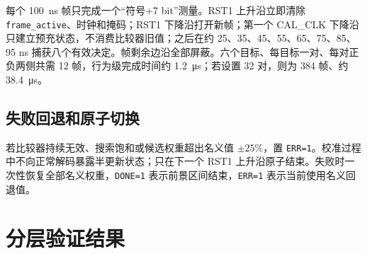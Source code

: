 \documentclass[UTF8,a4paper,11pt]{ctexart}
\newcommand{\code}[1]{\texttt{#1}}
\begin{document}
每个 \SI{100}{ns} 帧只完成一个“符号+7 bit”测量。RST1 上升沿立即清除 \code{frame\_active}、时钟和掩码；RST1 下降沿打开新帧；第一个 CAL\_CLK 下降沿只建立预充状态，不消费比较器旧值；之后在约 25、35、45、55、65、75、85、95 ns 捕获八个有效决定。帧剩余边沿全部屏蔽。六个目标、每目标一对、每对正负两侧共需 12 帧，行为级完成时间约 \SI{1.2}{\micro s}；若设置 32 对，则为 384 帧、约 \SI{38.4}{\micro s}。

\subsection{失败回退和原子切换}

若比较器持续无效、搜索饱和或候选权重超出名义值 $\pm25\%$，置 \code{ERR=1}。校准过程中不向正常解码暴露半更新状态；只在下一个 RST1 上升沿原子结束。失败时一次性恢复全部名义权重，\code{DONE=1} 表示前景区间结束，\code{ERR=1} 表示当前使用名义回退值。

\section{分层验证结果}
\end{document}
